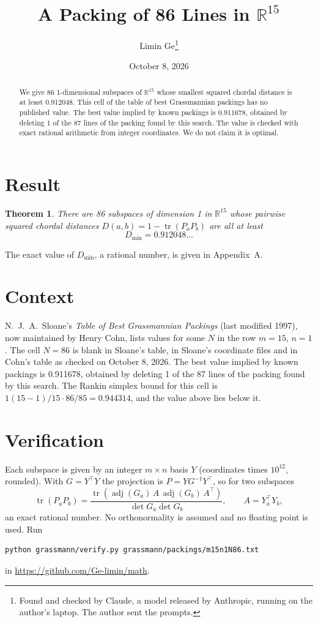 \documentclass[11pt,a4paper]{article}
\title{A Packing of 86 Lines in $\mathbb{R}^{15}$}
\author{Limin Ge\thanks{Found and checked by Claude, a model released by Anthropic, running on the author's laptop. The author sent the prompts.}}
\date{October 8, 2026}
\newtheorem*{theorem}{Theorem}
\begin{document}
\maketitle
\begin{abstract}
We give 86 1-dimensional subspaces of $\mathbb{R}^{15}$ whose smallest squared chordal distance is at least 0.912048. This cell of the table of best Grassmannian packings has no published value. The best value implied by known packings is 0.911678, obtained by deleting 1 of the 87 lines of the packing found by this search. The value is checked with exact rational arithmetic from integer coordinates. We do not claim it is optimal.
\end{abstract}

\section{Result}
\begin{theorem}
There are 86 subspaces of dimension 1 in $\mathbb{R}^{15}$ whose pairwise squared chordal distances $D(a,b) = 1 - \operatorname{tr}(P_aP_b)$ are all at least
\[ D_{\min} = 0.912048\ldots \]
\end{theorem}
The exact value of $D_{\min}$, a rational number, is given in Appendix~A.


\section{Context}
N.~J.~A.~Sloane's \emph{Table of Best Grassmannian Packings} (last modified 1997), now maintained by Henry Cohn, lists values for some $N$ in the row $m=15$, $n=1$. The cell $N=86$ is blank in Sloane's table, in Sloane's coordinate files and in Cohn's table as checked on October 8, 2026. The best value implied by known packings is 0.911678, obtained by deleting 1 of the 87 lines of the packing found by this search. The Rankin simplex bound for this cell is $1(15-1)/15\cdot 86/85 = 0.944314$, and the value above lies below it.


\section{Verification}
Each subspace is given by an integer $m\times n$ basis $Y$ (coordinates times $10^{12}$, rounded). With $G=Y^\top Y$ the projection is $P=YG^{-1}Y^\top$, so for two subspaces
\[ \operatorname{tr}(P_aP_b)=\frac{\operatorname{tr}(\operatorname{adj}(G_a)\,A\,\operatorname{adj}(G_b)\,A^\top)}{\det G_a\det G_b},\qquad A=Y_a^\top Y_b, \]
an exact rational number. No orthonormality is assumed and no floating point is used. Run
\begin{verbatim}
python grassmann/verify.py grassmann/packings/m15n1N86.txt
\end{verbatim}
in \url{https://github.com/Ge-limin/math}.
\end{document}
